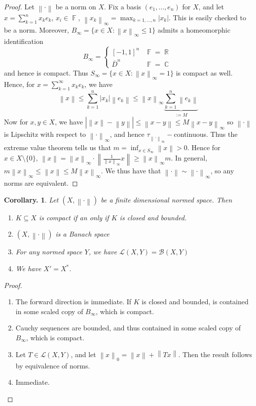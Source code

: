 \documentclass[11pt, a4paper]{memoir}
\DeclareMathOperator{\R}{{\mathbb{R}}}
\DeclareMathOperator{\C}{{\mathbb{C}}}
\DeclareMathOperator{\F}{{\mathbb{F}}}
\newcommand{\norm}[1]{\ensuremath{\left\lVert#1\right\rVert}}
\theoremstyle{change}
\newtheorem{corollary}[theorem]{Corollary.}
\theoremstyle{plain}
\theoremstyle{nonumberplain}
\newtheorem{proof}{Proof}
\numberwithin{equation}{section}
\begin{document}
\begin{proof}
    Let $\norm{\cdot}$ be a norm on $X$.
    Fix a basis $(e_1,\ldots,e_n)$ for $X$, and let $x=\sum_{k=1}^nx_ke_k$, $x_i\in\F$, $\norm{x_k}_\infty=\max_{k=1,\ldots,n}|x_k|$.
    This is easily checked to be a norm.
    Moreover, $B_\infty=\{x\in X:\norm{x}_\infty\leq 1\}$ admits a homeomorphic identification
    \begin{equation*}
        B_\infty=
        \begin{cases}
            [-1,1]^n &\F=\R\\
            \overline{D}^n & \F=\C
        \end{cases}
    \end{equation*}
    and hence is compact.
    Thus $S_\infty=\{x\in X:\norm{x}_\infty=1\}$ is compact as well.
    Hence, for $x=\sum_{k=1}^\infty x_ke_k$, we have
    \begin{equation*}
        \norm{x}\leq\sum_{k=1}^n|x_k|\norm{e_k}\leq\norm{x}_\infty\underbrace{\sum_{k=1}^n\norm{e_k}}_{:=M}
    \end{equation*}
    Now for $x,y\in X$, we have $|\norm{x}-\norm{y}|\leq\norm{x-y}\leq M\norm{x-y}_\infty$ so $\norm{\cdot}$ is Lipschitz with respect to $\norm{\cdot}_\infty$, and hence $\tau_{\norm{\cdot}_\infty}-$continuous.
    Thus the extreme value theorem tells us that $m=\inf_{x\in S_\infty}\norm{x}>0$.
    Hence for $x\in X\setminus\{0\}$, $\norm{x}=\norm{x}_\infty\cdot\norm{\frac{1}{\norm{x}_\infty}x}\geq\norm{x}_\infty m$.
    In general, $m\norm{x}_\infty\leq\norm{x}\leq M\norm{x}_\infty$.
    We thus have that $\norm{\cdot}\sim\norm{\cdot}_\infty$, so any norms are equivalent.
\end{proof}
\begin{corollary}
    Let $(X,\norm{\cdot})$ be a finite dimensional normed space.
    Then
    \begin{enumerate}[nl,r]
        \item $K\subseteq X$ is compact if an only if $K$ is closed and bounded.
        \item $(X,\norm{\cdot})$ is a Banach space
        \item For any normed space $Y$, we have $\mathcal{L}(X,Y)=\mathcal{B}(X,Y)$
        \item We have $X'=X^*$.
    \end{enumerate}
\end{corollary}
\begin{proof}
    \begin{enumerate}[nl,r]
        \item The forward direction is immediate.
            If $K$ is closed and bounded, is contained in some scaled copy of $B_\infty$, which is compact.
        \item Cauchy sequences are bounded, and thus contained in some scaled copy of $B_\infty$, which is compact.
        \item Let $T\in\mathcal{L}(X,Y)$, and let $\norm{x}_0=\norm{x}+\norm{Tx}$.
            Then the result follows by equivalence of norms.
        \item Immediate.
    \end{enumerate}
\end{proof}
\end{document}
